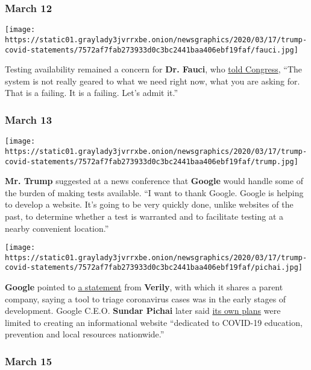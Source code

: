 \hypertarget{march-12}{%
\subsubsection{March 12}\label{march-12}}

\texttt{[image: https://static01.graylady3jvrrxbe.onion/newsgraphics/2020/03/17/trump-covid-statements/7572af7fab273933d0c3bc2441baa406ebf19faf/fauci.jpg]}

Testing availability remained a concern for \textbf{Dr. Fauci}, who
\href{https://www.c-span.org/video/?470277-1/federal-health-officials-testify-coronavirus-outbreak-response\&start=680}{told
Congress}, ``The system is not really geared to what we need right now,
what you are asking for. That is a failing. It is a failing. Let's admit
it.''

\hypertarget{march-13}{%
\subsubsection{March 13}\label{march-13}}

\texttt{[image: https://static01.graylady3jvrrxbe.onion/newsgraphics/2020/03/17/trump-covid-statements/7572af7fab273933d0c3bc2441baa406ebf19faf/trump.jpg]}

\textbf{Mr. Trump} suggested at a news conference that \textbf{Google}
would handle some of the burden of making tests available. ``I want to
thank Google. Google is helping to develop a website. It's going to be
very quickly done, unlike websites of the past, to determine whether a
test is warranted and to facilitate testing at a nearby convenient
location.''

\texttt{[image: https://static01.graylady3jvrrxbe.onion/newsgraphics/2020/03/17/trump-covid-statements/7572af7fab273933d0c3bc2441baa406ebf19faf/pichai.jpg]}

\textbf{Google} pointed to
\href{https://twitter.com/Google_Comms/status/1238574670686928906}{a
statement} from \textbf{Verily}, with which it shares a parent company,
saying a tool to triage coronavirus cases was in the early stages of
development. Google C.E.O. \textbf{Sundar Pichai} later said
\href{https://www.blog.google/inside-google/company-announcements/covid-19-how-were-continuing-to-help/}{its
own plans} were limited to creating an informational website ``dedicated
to COVID-19 education, prevention and local resources nationwide.''

\hypertarget{march-15}{%
\subsubsection{March 15}\label{march-15}}

